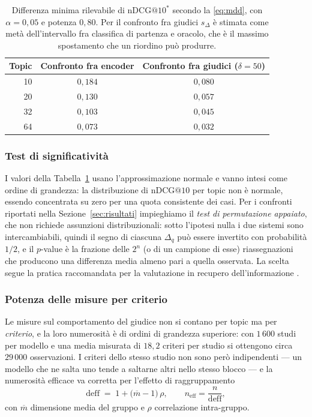 \documentclass[pdflatex,sn-mathphys-num]{sn-jnl}
\theoremstyle{thmstyleone}
\theoremstyle{thmstyletwo}
\theoremstyle{thmstylethree}
\begin{document}
\begin{table}[H]
\centering
\begin{tabular}{rcc}
\toprule
Topic & Confronto fra encoder & Confronto fra giudici ($\delta = 50$) \\
\midrule
10 & $0{,}184$ & $0{,}080$ \\
20 & $0{,}130$ & $0{,}057$ \\
32 & $0{,}103$ & $0{,}045$ \\
64 & $0{,}073$ & $0{,}032$ \\
\bottomrule
\end{tabular}
\caption{Differenza minima rilevabile di $\mathrm{nDCG@}10^{*}$ secondo la \eqref{eq:mdd}, con $\alpha = 0{,}05$ e potenza $0{,}80$. Per il confronto fra giudici $s_{\Delta}$ è stimata come metà dell'intervallo fra classifica di partenza e oracolo, che è il massimo spostamento che un riordino può produrre.}
\label{tab:mdd}
\end{table}

\subsubsection{Test di significatività}\label{sec:test}

I valori della Tabella~\ref{tab:mdd} usano l'approssimazione normale e vanno intesi come ordine di grandezza: la distribuzione di $\mathrm{nDCG@}10$ per topic non è normale, essendo concentrata su zero per una quota consistente dei casi. Per i confronti riportati nella Sezione~\ref{sec:risultati} impieghiamo il \emph{test di permutazione appaiato}, che non richiede assunzioni distribuzionali: sotto l'ipotesi nulla i due sistemi sono intercambiabili, quindi il segno di ciascuna $\Delta_q$ può essere invertito con probabilità $1/2$, e il $p$-value è la frazione delle $2^{n}$ (o di un campione di esse) riassegnazioni che producono una differenza media almeno pari a quella osservata. La scelta segue la pratica raccomandata per la valutazione in recupero dell'informazione \cite{smucker2007comparison}.

\subsubsection{Potenza delle misure per criterio}\label{sec:potenza-criteri}

Le misure sul comportamento del giudice non si contano per topic ma per \emph{criterio}, e la loro numerosità è di ordini di grandezza superiore: con $1\,600$ studi per modello e una media misurata di $18{,}2$ criteri per studio si ottengono circa $29\,000$ osservazioni. I criteri dello stesso studio non sono però indipendenti --- un modello che ne salta uno tende a saltarne altri nello stesso blocco --- e la numerosità efficace va corretta per l'effetto di raggruppamento
\begin{equation}
  \mathrm{deff} \;=\; 1 + \big(\overline{m} - 1\big)\,\rho, \qquad n_{\text{eff}} = \frac{n}{\mathrm{deff}},
  \label{eq:deff}
\end{equation}
con $\overline{m}$ dimensione media del gruppo e $\rho$ correlazione intra-gruppo.
\end{document}
